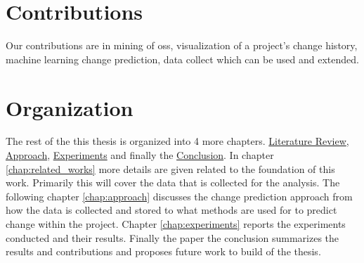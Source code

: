 \section{Contributions}


Our contributions are in mining of \gls{oss}, visualization of a project's change history, machine learning change prediction, data collect which can be used and extended.

\section{Organization}

The rest of the this thesis is organized into 4 more chapters. \hyperref[chap:related_works]{Literature Review}, \hyperref[chap:approach]{Approach}, \hyperref[chap:experiments]{Experiments} and finally the \hyperref[chap:conclusions]{Conclusion}. In chapter \ref{chap:related_works} more details are given related to the foundation of this work. Primarily this will cover the data that is collected for the analysis. The following chapter \ref{chap:approach} discusses the change prediction approach from how the data is collected and stored to what methods are used for to predict change within the project. Chapter \ref{chap:experiments} reports the experiments conducted and their results. Finally the paper the conclusion summarizes the results and contributions and proposes future work to build of the thesis.